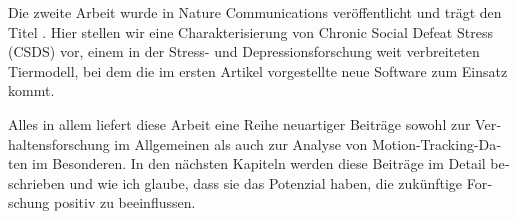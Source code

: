 \begin{otherlanguage}{german}
Die zweite Arbeit wurde in Nature Communications veröffentlicht und trägt den Titel \natcommtitle. Hier stellen wir eine Charakterisierung von Chronic Social Defeat Stress (CSDS) vor, einem in der Stress- und Depressionsforschung weit verbreiteten Tiermodell, bei dem die im ersten Artikel vorgestellte neue Software zum Einsatz kommt.

Alles in allem liefert diese Arbeit eine Reihe neuartiger Beiträge sowohl zur Verhaltensforschung im Allgemeinen als auch zur Analyse von Motion-Tracking-Daten im Besonderen. In den nächsten Kapiteln werden diese Beiträge im Detail beschrieben und wie ich glaube, dass sie das Potenzial haben, die zukünftige Forschung positiv zu beeinflussen.

\end{otherlanguage}